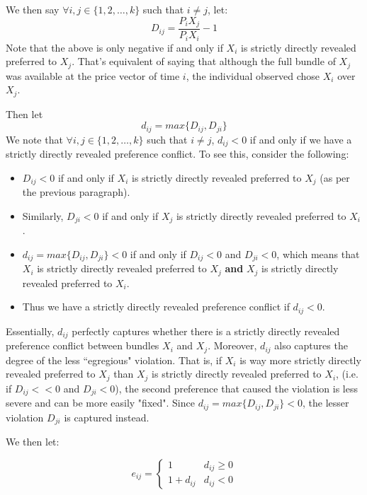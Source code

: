 \documentclass{article} %
\begin{document}
We then say $\forall i,j\in\{1,2,\ldots,k\}$ such that $i\not=j$, let:
    $$D_{ij}=\frac{P_{i}X_{j}}{P_{i}X_{i}}-1$$
Note that the above is only negative if and only if $X_{i}$ is strictly directly revealed preferred to $X_{j}$. That's equivalent of saying that although the full bundle of $X_{j}$ was available at the price vector of time $i$, the individual observed chose $X_{i}$ over $X_{j}$.


Then let
$$d_{ij}=max\{D_{ij}, D_{ji}\}$$
We note that $\forall i,j\in\{1,2,\ldots,k\}$ such that $i\not=j$, $d_{ij}<0$ if and only if we have a strictly directly revealed preference conflict. To see this, consider the following:

\begin{itemize}
    \item $D_{ij}<0$ if and only if $X_{i}$ is strictly directly revealed preferred to $X_{j}$ (as per the previous paragraph). 
    \item Similarly, $D_{ji}<0$ if and only if $X_{j}$ is strictly directly revealed preferred to $X_{i}$.
    \item $d_{ij}=max\{D_{ij}, D_{ji}\}<0$ if and only if $D_{ij}<0$ and $D_{ji}<0$, which means that $X_{i}$ is strictly directly revealed preferred to $X_{j}$ \textbf{and} $X_{j}$ is strictly directly revealed preferred to $X_{i}$. 
    \item Thus we have a strictly directly revealed preference conflict if $d_{ij} < 0$.
\end{itemize}

Essentially, $d_{ij}$ perfectly captures whether there is a strictly directly revealed preference conflict between bundles $X_{i}$ and $X_{j}$. Moreover, $d_{ij}$ also captures the degree of the less ``egregious" violation. That is, if $X_{i}$ is way more strictly directly revealed preferred to $X_{j}$ than $X_{j}$ is strictly directly revealed preferred to $X_{i}$, (i.e. if $D_{ij}<<0$ and $D_{ji}<0$), the second preference that caused the violation is less severe and can be more easily "fixed". Since $d_{ij}=max\{D_{ij}, D_{ji}\}<0$, the lesser violation $D_{ji}$ is captured instead.

We then let:

\[
e_{ij}=
\begin{cases}
1 & d_{ij}\geq0 \\
1+d_{ij} & d_{ij}<0
\end{cases}
\]
\end{document}
